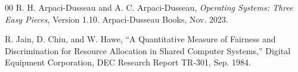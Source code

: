 \documentclass[conference]{IEEEtran}
\begin{document}
\begin{thebibliography}{00}
R. H. Arpaci-Dusseau and A. C. Arpaci-Dusseau, \textit{Operating Systems: Three Easy Pieces}, Version 1.10. Arpaci-Dusseau Books, Nov. 2023.

R. Jain, D. Chiu, and W. Hawe, ``A Quantitative Measure of Fairness and Discrimination for Resource Allocation in Shared Computer Systems,'' Digital Equipment Corporation, DEC Research Report TR-301, Sep. 1984.
\end{thebibliography}
\end{document}
